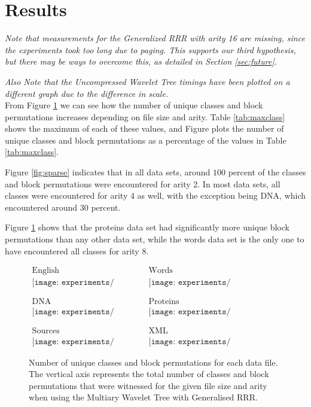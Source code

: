 \section{Results}
\label{sec:results}
\emph{Note that measurements for the Generalized RRR with arity 16 are missing, 
since the experiments took too long due to paging. This supports our third 
hypothesis, but there may be ways to overcome this, as detailed in Section 
\ref{sec:future}.}

\emph{Also Note that the Uncompressed Wavelet Tree timings have been plotted on 
a different graph due to the difference in scale.}\\



From Figure \ref{fig:unique} we can see how the number of unique classes and 
block permutations increases depending on file size and arity. Table 
\ref{tab:maxclass} shows the maximum of each of these values, and Figure 
\label{fig:sparse} plots the number of unique classes and block permutations as
a percentage of the values in Table \ref{tab:maxclass}.

Figure \ref{fig:sparse} indicates that in all data sets, around $100$ percent of
the classes and block permutations were encountered for arity 2. In most data
sets, all classes were encountered for arity 4 as well, with the exception being 
DNA, which encountered around $30$ percent.

Figure \ref{fig:unique} shows that the proteins data set had significantly more
unique block permutations than any other data set, while the words data set is 
the only one to have encountered all classes for arity 8.

\begin{figure}[h]
\begin{center}
$\begin{array}{cc}
\mbox{English} & \mbox{Words} \\
\texttt{[image: experiments/unique\_english]} &
\texttt{[image: experiments/unique\_english\_ints]} \\ \\ \\
\mbox{DNA} & \mbox{Proteins} \\ 
\texttt{[image: experiments/unique\_dna]} &
\texttt{[image: experiments/unique\_proteins]} \\ \\ \\
\mbox{Sources} & \mbox{XML} \\
\texttt{[image: experiments/unique\_sources]} &
\texttt{[image: experiments/unique\_dblp\_xml]}
\end{array}$
\end{center}
\caption{Number of unique classes and block permutations for each data 
file. The vertical axis represents the total number of classes and block
permutations that were witnessed for the given file size and arity when using 
the Multiary Wavelet Tree with Generalised RRR.}
\label{fig:unique}
\end{figure}
	
